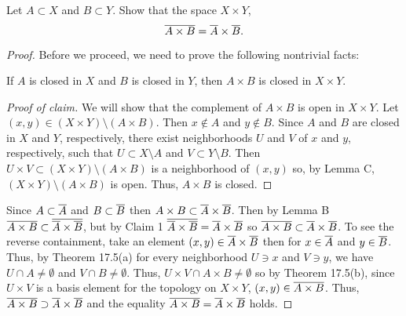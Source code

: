 \begin{problem}
Let $A\subset X$ and $B\subset Y$. Show that the space $X\times Y$,
\[\overline{A\times B}=\overline{A}\times\overline{B}.\]
\end{problem}
\begin{proof}
Before we proceed, we need to prove the following nontrivial facts:
\begin{claim}[Munkres \S17, Ex.\,3]
If $A$ is closed in $X$ and $B$ is closed in $Y$, then $A\times
B$ is closed in $X\times Y$.
\end{claim}
\begin{proof}[Proof of claim]
\renewcommand\qedsymbol{$\clubsuit$}
We will show that the complement of $A\times B$ is open in
$X\times Y$. Let $(x,y)\in (X\times Y)\setminus(A\times B)$. Then
$x\notin A$ and $y\notin B$. Since $A$ and $B$ are closed in $X$
and $Y$, respectively, there exist neighborhoods $U$ and $V$ of
$x$ and $y$, respectively, such that $U\subset X\setminus A$ and
$V\subset Y\setminus B$. Then $U\times V\subset (X\times
Y)\setminus(A\times B)$ is a neighborhood of $(x,y)$ so, by Lemma
C, $(X\times Y)\setminus(A\times B)$ is open. Thus, $A\times B$
is closed.
\end{proof}

Since $A\subset\overline{A}$ and $B\subset\overline{B}$ then $A\times
B\subset\overline{A}\times\overline{B}$. Then by Lemma B
$\overline{A\times B}\subset\overline{\overline{A}\times\overline{B}}$, but by
Claim 1 $\overline{\overline{A}\times\overline{B}}=\overline{A}\times\overline{B}$ so
$\overline{A\times B}\subset\overline{A}\times\overline{B}$. To see the reverse
containment, take an element $(x,y)\in \overline{A}\times\overline{B}$ then
for $x\in\overline{A}$ and $y\in\overline{B}$. Thus, by Theorem 17.5(a) for
every neighborhood $U\ni x$ and $V\ni y$, we have $U\cap
A\neq\emptyset$ and $V\cap B\neq\emptyset$. Thus, $U\times V\cap
A\times B\neq\emptyset$ so by Theorem 17.5(b), since $U\times V$
is a basis element for the topology on $X\times Y$,
$(x,y)\in\overline{A\times B}$. Thus, $\overline{A\times B}\supset\overline{A}\times\overline{B}$ and the equality $\overline{A\times B}=\overline{A}\times\overline{B}$ holds.
\end{proof}
